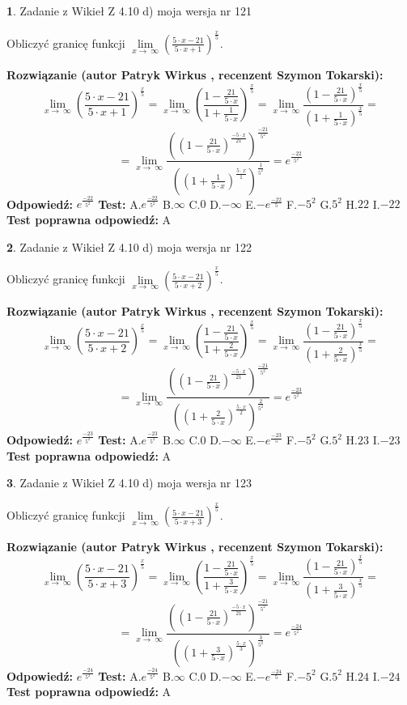\documentclass[12pt, a4paper]{article}
\theoremstyle{definition} %
\newtheorem{zad}{}
\newcommand{\zadStart}[1]{\begin{zad}#1\newline}
\newcommand{\zadStop}{\end{zad}}
\newcommand{\rozwStart}[2]{\noindent \textbf{Rozwiązanie (autor #1 , recenzent #2): }\newline}
\newcommand{\rozwStop}{\newline}
\newcommand{\odpStart}{\noindent \textbf{Odpowiedź:}\newline}
\newcommand{\odpStop}{\newline}
\newcommand{\testStart}{\noindent \textbf{Test:}\newline}
\newcommand{\testStop}{\newline}
\newcommand{\kluczStart}{\noindent \textbf{Test poprawna odpowiedź:}\newline}
\newcommand{\kluczStop}{\newline}
\begin{document}
\zadStart{Zadanie z Wikieł Z 4.10 d) moja wersja nr 121}


Obliczyć granicę funkcji  $\lim\limits_{x\to\ \infty}(\frac{5\cdot x-21}{5\cdot x+1})^{\frac{x}{5}}$.
\zadStop
\rozwStart{Patryk Wirkus}{Szymon Tokarski}
$$\lim\limits_{x\to\ \infty}(\frac{5\cdot x-21}{5\cdot x+1})^{\frac{x}{5}} = \lim\limits_{x\to\ \infty}(\frac{1-\frac{21}{5\cdot x}}{1+\frac{1}{5\cdot x}})^{\frac{x}{5}}=\lim\limits_{x\to\ \infty}\frac{(1-\frac{21}{5\cdot x})^{\frac{x}{5}}}{(1+\frac{1}{5\cdot x})^{\frac{x}{5}}}=$$
$$=\lim\limits_{x\to\ \infty}\frac{((1-\frac{21}{5\cdot x})^{\frac{-5\cdot x}{21}})^{\frac{-21}{5^{2}}}}{((1+\frac{1}{5\cdot x})^{\frac{5\cdot x}{1}})^{\frac{1}{5^{2}}}}=e^{\frac{-22}{5^{2}}}$$
\rozwStop
\odpStart
$e^{\frac{-22}{5^{2}}}$
\odpStop
\testStart
A.$e^{\frac{-22}{5^{2}}}$ B.$\infty$ C.$0$ D.$-\infty$ E.$-e^{\frac{-22}{5}}$
F.$-5^{2}$ G.$5^{2}$
H.$22$
I.$-22$
\testStop
\kluczStart
A
\kluczStop



\zadStart{Zadanie z Wikieł Z 4.10 d) moja wersja nr 122}


Obliczyć granicę funkcji  $\lim\limits_{x\to\ \infty}(\frac{5\cdot x-21}{5\cdot x+2})^{\frac{x}{5}}$.
\zadStop
\rozwStart{Patryk Wirkus}{Szymon Tokarski}
$$\lim\limits_{x\to\ \infty}(\frac{5\cdot x-21}{5\cdot x+2})^{\frac{x}{5}} = \lim\limits_{x\to\ \infty}(\frac{1-\frac{21}{5\cdot x}}{1+\frac{2}{5\cdot x}})^{\frac{x}{5}}=\lim\limits_{x\to\ \infty}\frac{(1-\frac{21}{5\cdot x})^{\frac{x}{5}}}{(1+\frac{2}{5\cdot x})^{\frac{x}{5}}}=$$
$$=\lim\limits_{x\to\ \infty}\frac{((1-\frac{21}{5\cdot x})^{\frac{-5\cdot x}{21}})^{\frac{-21}{5^{2}}}}{((1+\frac{2}{5\cdot x})^{\frac{5\cdot x}{2}})^{\frac{2}{5^{2}}}}=e^{\frac{-23}{5^{2}}}$$
\rozwStop
\odpStart
$e^{\frac{-23}{5^{2}}}$
\odpStop
\testStart
A.$e^{\frac{-23}{5^{2}}}$ B.$\infty$ C.$0$ D.$-\infty$ E.$-e^{\frac{-23}{5}}$
F.$-5^{2}$ G.$5^{2}$
H.$23$
I.$-23$
\testStop
\kluczStart
A
\kluczStop



\zadStart{Zadanie z Wikieł Z 4.10 d) moja wersja nr 123}


Obliczyć granicę funkcji  $\lim\limits_{x\to\ \infty}(\frac{5\cdot x-21}{5\cdot x+3})^{\frac{x}{5}}$.
\zadStop
\rozwStart{Patryk Wirkus}{Szymon Tokarski}
$$\lim\limits_{x\to\ \infty}(\frac{5\cdot x-21}{5\cdot x+3})^{\frac{x}{5}} = \lim\limits_{x\to\ \infty}(\frac{1-\frac{21}{5\cdot x}}{1+\frac{3}{5\cdot x}})^{\frac{x}{5}}=\lim\limits_{x\to\ \infty}\frac{(1-\frac{21}{5\cdot x})^{\frac{x}{5}}}{(1+\frac{3}{5\cdot x})^{\frac{x}{5}}}=$$
$$=\lim\limits_{x\to\ \infty}\frac{((1-\frac{21}{5\cdot x})^{\frac{-5\cdot x}{21}})^{\frac{-21}{5^{2}}}}{((1+\frac{3}{5\cdot x})^{\frac{5\cdot x}{3}})^{\frac{3}{5^{2}}}}=e^{\frac{-24}{5^{2}}}$$
\rozwStop
\odpStart
$e^{\frac{-24}{5^{2}}}$
\odpStop
\testStart
A.$e^{\frac{-24}{5^{2}}}$ B.$\infty$ C.$0$ D.$-\infty$ E.$-e^{\frac{-24}{5}}$
F.$-5^{2}$ G.$5^{2}$
H.$24$
I.$-24$
\testStop
\kluczStart
A
\kluczStop
\end{document}
